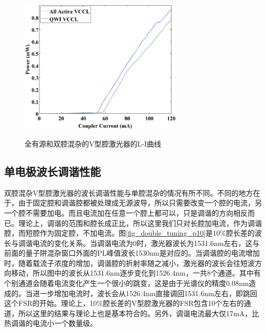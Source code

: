 \documentclass{ZJUthesis}
\begin{document}
\begin{figure}[!ht]
  \centering
  \includegraphics[width=0.7\textwidth]{./Pictures/double_li.eps}\\
  \caption{全有源和双腔混杂的V型腔激光器的L-I曲线}
  \label{fig_double_li}
\end{figure}

\subsection{单电极波长调谐性能}

双腔混杂V型腔激光器的波长调谐性能与单腔混杂的情况有所不同。不同的地方在于，由于固定腔和调谐腔都被处理成无源波导，所以只需要改变一个腔的电流，另一个腔不需要加电。而且电流加在任意一个腔上都可以，只是调谐的方向相反而已。理论上，调谐的范围和腔长成正比，所以这里我们只对长腔加电流，作为调谐腔，而短腔作为固定腔，不加电流。图\ref{fig_double_tuning_p10}是10\%腔长差的波长与调谐电流的变化关系。当调谐电流为0时，激光器波长为1531.6nm左右，这与前面的量子阱混杂窗口外面的PL峰值波长1530nm是对应的。当调谐腔的电流增加时，随着载流子浓度的增加，调谐腔的折射率随之减小，激光器的波长会往短波方向移动，所以图中的波长从1531.6nm逐步变化到1526.4nm，一共8个通道。其中有个别通道会随着电流变化产生一个很小的跳变，这是由于光谱仪的精度0.08nm造成的。当进一步增加电流时，波长会从1526.4nm直接调回1531.6nm左右，即跳回这个FSR的开始。理论上，10\%腔长差的V型腔激光器的FSR包含10个左右的通道，所以这里的结果与理论上也是基本符合的。另外，调谐电流最大仅17mA，比热调谐的电流小一个数量级。
\end{document}
